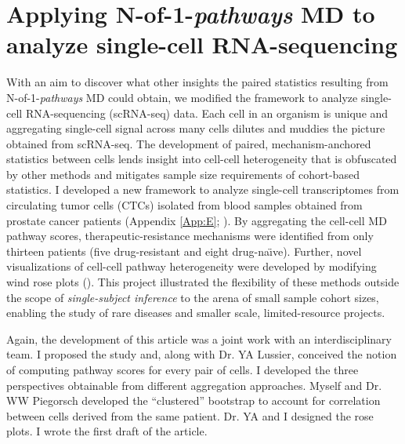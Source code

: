 \chapter{Applying N-of-1-\emph{pathways} MD to\\analyze single-cell RNA-sequencing} \label{Chap:ctcs}

\indent \indent With an aim to discover what other insights the paired statistics resulting from N-of-1-\emph{pathways} MD could obtain, we modified the framework to analyze single-cell RNA-sequencing (scRNA-seq) data. Each cell in an organism is unique and aggregating single-cell signal across many cells dilutes and muddies the picture obtained from scRNA-seq. The development of paired, mechanism-anchored statistics between cells lends insight into cell-cell heterogeneity that is obfuscated by other methods and mitigates sample size requirements of cohort-based statistics. I developed a new framework to analyze single-cell transcriptomes from circulating tumor cells (CTCs) isolated from blood samples obtained from prostate cancer patients (Appendix \ref{App:E}; \cite{Patel2014,Schissler2016}). By aggregating the cell-cell MD pathway scores, therapeutic-resistance mechanisms were identified from only thirteen patients (five drug-resistant and eight drug-na\"{\i}ve). Further, novel visualizations of cell-cell pathway heterogeneity were developed by modifying wind rose plots (\cite{Court1963}). This project illustrated the flexibility of these methods outside the scope of \emph{single-subject inference} to the arena of small sample cohort sizes, enabling the study of rare diseases and smaller scale, limited-resource projects.

Again, the development of this article was a joint work with an interdisciplinary team. I proposed the study and, along with Dr. YA Lussier, conceived the notion of computing pathway scores for every pair of cells. I developed the three perspectives obtainable from different aggregation approaches. Myself and Dr. WW Piegorsch developed the ``clustered'' bootstrap to account for correlation between cells derived from the same patient. Dr. YA and I designed the rose plots. I wrote the first draft of the article.
